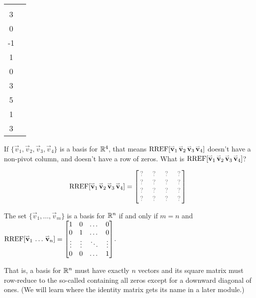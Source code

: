 \begin{activity}{15}
\begin{center}
\begin{tabular}{cc}
     \(E=\left\{
      \begin{bmatrix}5\\3\\0\\-1\end{bmatrix},
      \begin{bmatrix}-2\\1\\0\\3\end{bmatrix},
      \begin{bmatrix}4\\5\\1\\3\end{bmatrix}
      \right\}
      \)  &
    \end{tabular}
  \end{center}
\end{activity}

\begin{activity}{10}
  If \(\{\vec v_1,\vec v_2,\vec v_3,\vec v_4\}\) is a basis for
  \(\mathbb{R}^4\), that means \(\operatorname{RREF}[\mathbf{\accentset{\rightharpoonup}{v}}_1\,\mathbf{\accentset{\rightharpoonup}{v}}_2\,\mathbf{\accentset{\rightharpoonup}{v}}_3\,\mathbf{\accentset{\rightharpoonup}{v}}_4]\)
  doesn't have a non-pivot column, and doesn't have a
  row of zeros. What is \(\operatorname{RREF}[\mathbf{\accentset{\rightharpoonup}{v}}_1\,\mathbf{\accentset{\rightharpoonup}{v}}_2\,\mathbf{\accentset{\rightharpoonup}{v}}_3\,\mathbf{\accentset{\rightharpoonup}{v}}_4]\)?

  \[
    \RREF[\vec v_1\,\vec v_2\,\vec v_3\,\vec v_4]
      =
    \begin{bmatrix}
      \unknown & \unknown & \unknown & \unknown \\
      \unknown & \unknown & \unknown & \unknown \\
      \unknown & \unknown & \unknown & \unknown \\
      \unknown & \unknown & \unknown & \unknown \\
    \end{bmatrix}
  \]
\end{activity}

\begin{fact}
  The set \(\{\vec v_1,\dots,\vec v_m\}\) is a basis for \(\mathbb{R}^n\) if and
  only if \(m=n\) and
  \(\operatorname{RREF}[\mathbf{\accentset{\rightharpoonup}{v}}_1\,\dots\,\mathbf{\accentset{\rightharpoonup}{v}}_n]=
  \begin{bmatrix}
    1&0&\dots&0\\
    0&1&\dots&0\\
    \vdots&\vdots&\ddots&\vdots\\
    0&0&\dots&1
  \end{bmatrix}
  \).

  That is, a basis for \(\mathbb{R}^n\) must have exactly \(n\) vectors and
  its square matrix must row-reduce to the so-called 
  containing all zeros except for a downward diagonal of ones.
  (We will learn where the identity matrix gets its name in a later module.)
\end{fact}

